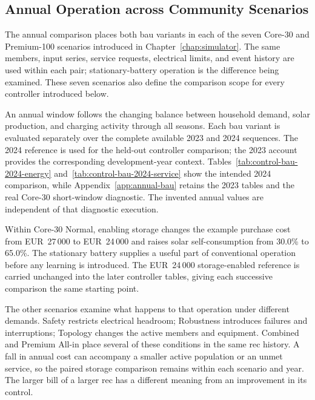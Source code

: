 \subsection{Annual Operation across Community Scenarios}
\label{sec:control-common-protocol}

The annual comparison places both \gls{bau} variants in each of the seven Core-30 and Premium-100 scenarios introduced in Chapter~\ref{chap:simulator}. The same members, input series, service requests, electrical limits, and event history are used within each pair; stationary-battery operation is the difference being examined. These seven scenarios also define the comparison scope for every controller introduced below.

An annual window follows the changing balance between household demand, solar production, and charging activity through all seasons. Each \gls{bau} variant is evaluated separately over the complete available 2023 and 2024 sequences. The 2024 reference is used for the held-out controller comparison; the 2023 account provides the corresponding development-year context. Tables~\ref{tab:control-bau-2024-energy} and~\ref{tab:control-bau-2024-service} show the intended 2024 comparison, while Appendix~\ref{app:annual-bau} retains the 2023 tables and the real Core-30 short-window diagnostic. The invented annual values are independent of that diagnostic execution.



\illustrativereading Within Core-30 Normal, enabling storage changes the example purchase cost from EUR~27\,000 to EUR~24\,000 and raises solar self-consumption from 30.0\% to 65.0\%. The stationary battery supplies a useful part of conventional operation before any learning is introduced. The EUR~24\,000 storage-enabled reference is carried unchanged into the later controller tables, giving each successive comparison the same starting point.

The other scenarios examine what happens to that operation under different demands. Safety restricts electrical headroom; Robustness introduces failures and interruptions; Topology changes the active members and equipment. Combined and Premium All-in place several of these conditions in the same \gls{rec} history. A fall in annual cost can accompany a smaller active population or an unmet service, so the paired storage comparison remains within each scenario and year. The larger bill of a larger \gls{rec} has a different meaning from an improvement in its control.

